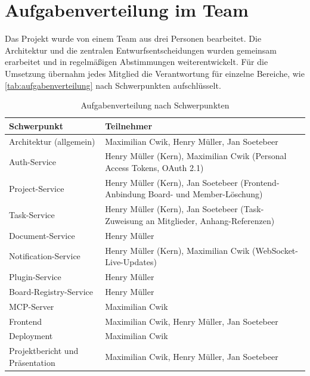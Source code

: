 \section{Aufgabenverteilung im Team}
\label{sec:aufgabenverteilung}

Das Projekt wurde von einem Team aus drei Personen bearbeitet. Die Architektur und die zentralen Entwurfsentscheidungen wurden gemeinsam erarbeitet und in regelmäßigen Abstimmungen weiterentwickelt. Für die Umsetzung übernahm jedes Mitglied die Verantwortung für einzelne Bereiche, wie \vref{tab:aufgabenverteilung} nach Schwerpunkten aufschlüsselt.

\begin{table}[ht]
  \centering
  \caption{Aufgabenverteilung nach Schwerpunkten}
  \label{tab:aufgabenverteilung}
  \begin{tabularx}{\linewidth}{@{}lX@{}}
    \toprule
    \textbf{Schwerpunkt} & \textbf{Teilnehmer} \\
    \midrule
    Architektur (allgemein)          & Maximilian Cwik, Henry Müller, Jan Soetebeer \\
    \midrule
    Auth-Service                     & Henry Müller (Kern), Maximilian Cwik (Personal Access Tokens, OAuth 2.1) \\
    Project-Service                  & Henry Müller (Kern), Jan Soetebeer (Frontend-Anbindung Board- und Member-Löschung) \\
    Task-Service                     & Henry Müller (Kern), Jan Soetebeer (Task-Zuweisung an Mitglieder, Anhang-Referenzen) \\
    Document-Service                 & Henry Müller \\
    Notification-Service             & Henry Müller (Kern), Maximilian Cwik (WebSocket-Live-Updates) \\
    Plugin-Service                   & Henry Müller \\
    Board-Registry-Service           & Henry Müller \\
    MCP-Server                       & Maximilian Cwik \\
    \midrule
    Frontend                         & Maximilian Cwik, Henry Müller, Jan Soetebeer \\
    Deployment                       & Maximilian Cwik \\
    Projektbericht und Präsentation  & Maximilian Cwik, Henry Müller, Jan Soetebeer \\
    \bottomrule
  \end{tabularx}
\end{table}

